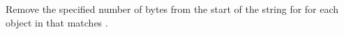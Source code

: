 Remove the specified number of bytes from the start of the string for for each
object in  that matches .


